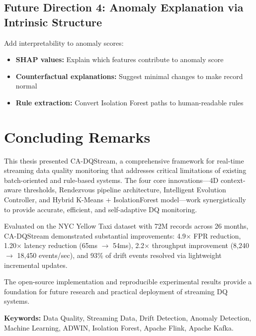 \subsection{Future Direction 4: Anomaly Explanation via Intrinsic Structure}
Add interpretability to anomaly scores:
\begin{itemize}
    \item \textbf{SHAP values:} Explain which features contribute to anomaly score
    \item \textbf{Counterfactual explanations:} Suggest minimal changes to make record normal
    \item \textbf{Rule extraction:} Convert Isolation Forest paths to human-readable rules
\end{itemize}

\section{Concluding Remarks}

This thesis presented CA-DQStream, a comprehensive framework for real-time streaming data quality monitoring that addresses critical limitations of existing batch-oriented and rule-based systems. The four core innovations---4D context-aware thresholds, Rendezvous pipeline architecture, Intelligent Evolution Controller, and Hybrid K-Means + IsolationForest model---work synergistically to provide accurate, efficient, and self-adaptive DQ monitoring.

Evaluated on the NYC Yellow Taxi dataset with 72M records across 26 months, CA-DQStream demonstrated substantial improvements: 4.9$\times$ FPR reduction, 1.20$\times$ latency reduction (65ms $\to$ 54ms), 2.2$\times$ throughput improvement (8,240 $\to$ 18,450 events/sec), and 93\% of drift events resolved via lightweight incremental updates.

The open-source implementation and reproducible experimental results provide a foundation for future research and practical deployment of streaming DQ systems.

\textbf{Keywords:} Data Quality, Streaming Data, Drift Detection, Anomaly Detection, Machine Learning, ADWIN, Isolation Forest, Apache Flink, Apache Kafka.

